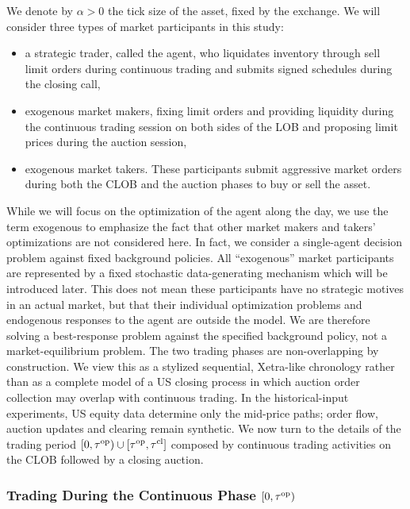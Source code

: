 \documentclass[11pt]{article}
\begin{document}
We denote by $\alpha > 0$ the tick size of the asset, fixed by the exchange. We will consider three types of market participants in this study:
\begin{itemize}
\item a strategic trader, called the agent, who liquidates inventory through sell limit orders during continuous trading and submits signed schedules during the closing call,
\item exogenous market makers, fixing limit orders and providing liquidity during the continuous trading session on both sides of the LOB and proposing limit prices during the auction session,
\item exogenous market takers. These participants submit aggressive market orders during both the CLOB and the auction phases to buy or sell the asset.
\end{itemize}
While we will focus on the optimization of the agent along the day, we use the term exogenous to emphasize the fact that other market makers and takers' optimizations are not considered here. In fact, we consider a single-agent decision problem against fixed background policies. All ``exogenous'' market participants are represented by a fixed stochastic data-generating mechanism which will be introduced later. This does not mean these participants have no strategic motives in an actual market, but that their individual optimization problems and endogenous responses to the agent are outside the model. We are therefore solving a best-response problem against the specified background policy, not a market-equilibrium problem. The two trading phases are non-overlapping by construction. We view this as a stylized sequential, Xetra-like chronology rather than as a complete model of a US closing process in which auction order collection may overlap with continuous trading. In the historical-input experiments, US equity data determine only the mid-price paths; order flow, auction updates and clearing remain synthetic. We now turn to the details of the trading period $[0,\tau^{\mathrm{op}})\cup[\tau^{\mathrm{op}},\tau^{\mathrm{cl}}]$ composed by continuous trading activities on the CLOB followed by a closing auction.

\subsubsection{Trading During the Continuous Phase \texorpdfstring{$[ 0,  \tau^{\mathrm{op}} )$}{}}\label{sec:lob}
\end{document}
